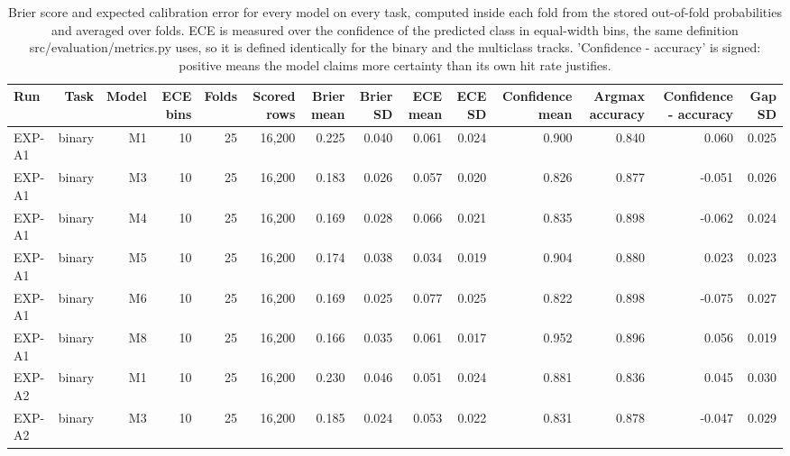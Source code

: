 \begin{table}[htbp]
  \centering
  \caption{Brier score and expected calibration error for every model on every task, computed inside each fold from the stored out-of-fold probabilities and averaged over folds. ECE is measured over the confidence of the predicted class in equal-width bins, the same definition src/evaluation/metrics.py uses, so it is defined identically for the binary and the multiclass tracks. 'Confidence - accuracy' is signed: positive means the model claims more certainty than its own hit rate justifies.}
  \label{tab:t23}
  \begin{tabular}{lrrrrrrrrrrrrr}
    \toprule
    Run & Task & Model & ECE bins & Folds & Scored rows & Brier mean & Brier SD & ECE mean & ECE SD & Confidence mean & Argmax accuracy & Confidence - accuracy & Gap SD \\
    \midrule
    EXP-A1 & binary & M1 & 10 & 25 & 16,200 & 0.225 & 0.040 & 0.061 & 0.024 & 0.900 & 0.840 & 0.060 & 0.025 \\
    EXP-A1 & binary & M3 & 10 & 25 & 16,200 & 0.183 & 0.026 & 0.057 & 0.020 & 0.826 & 0.877 & -0.051 & 0.026 \\
    EXP-A1 & binary & M4 & 10 & 25 & 16,200 & 0.169 & 0.028 & 0.066 & 0.021 & 0.835 & 0.898 & -0.062 & 0.024 \\
    EXP-A1 & binary & M5 & 10 & 25 & 16,200 & 0.174 & 0.038 & 0.034 & 0.019 & 0.904 & 0.880 & 0.023 & 0.023 \\
    EXP-A1 & binary & M6 & 10 & 25 & 16,200 & 0.169 & 0.025 & 0.077 & 0.025 & 0.822 & 0.898 & -0.075 & 0.027 \\
    EXP-A1 & binary & M8 & 10 & 25 & 16,200 & 0.166 & 0.035 & 0.061 & 0.017 & 0.952 & 0.896 & 0.056 & 0.019 \\
    EXP-A2 & binary & M1 & 10 & 25 & 16,200 & 0.230 & 0.046 & 0.051 & 0.024 & 0.881 & 0.836 & 0.045 & 0.030 \\
    EXP-A2 & binary & M3 & 10 & 25 & 16,200 & 0.185 & 0.024 & 0.053 & 0.022 & 0.831 & 0.878 & -0.047 & 0.029 \\

\end{tabular}
\end{table}
